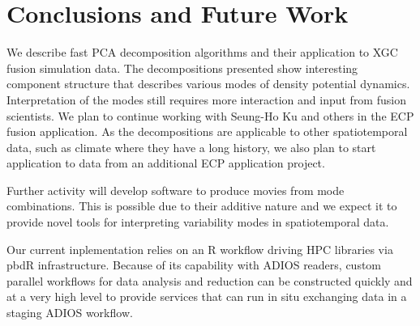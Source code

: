 \section{Conclusions and Future Work}
\label{sec:concl}
We describe fast PCA decomposition algorithms and their application to
XGC fusion simulation data. The decompositions presented show
interesting component structure that describes various modes of
density potential dynamics. Interpretation of the modes still requires
more interaction and input from fusion scientists. We plan to continue
working with Seung-Ho Ku and others in the ECP fusion application. As
the decompositions are applicable to other spatiotemporal data, such
as climate where they have a long history, we also plan to start
application to data from an additional ECP application project.

Further activity will develop software to produce movies from mode
combinations. This is possible due to their additive nature and we
expect it to provide novel tools for interpreting variability modes
in spatiotemporal data.

Our current inplementation relies on an R workflow driving HPC
libraries via pbdR infrastructure. Because of its capability with
ADIOS readers, custom parallel workflows for data analysis and
reduction can be constructed quickly and at a very high level to
provide services that can run in situ exchanging data in a staging
ADIOS workflow.
